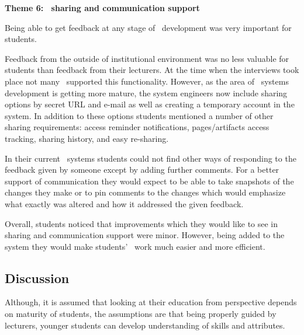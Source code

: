 \textbf{Theme 6: \ep~sharing and communication support}

Being able to get feedback at any stage of \ep~development was very important
for students.


Feedback from the outside of institutional environment was no less valuable for
students than feedback from their lecturers. At the time when the interviews
took place not many \ep~supported this functionality. However, as the area of
\ep~systems development is getting more mature, the system engineers now include
sharing options by secret URL and e-mail as well as creating a temporary account
in the system. In addition to these options students mentioned a number of other
sharing requirements: access reminder notifications, pages/artifacts access
tracking, sharing history, and easy re-sharing.

In their current \ep~systems students could not find other ways of responding to
the feedback given by someone except by adding further comments. For a better
support of communication they would expect to be able to take snapshots of the
changes they make or to pin comments to the changes which would emphasize what
exactly was altered and how it addressed the given feedback.


Overall, students noticed that improvements which they would like to see in
sharing and communication support were minor. However, being added to the system
they would make students' \ep~work much easier and more efficient.

\subsection{Discussion}

Although, it is assumed that looking at their education from \LLLs
perspective depends on maturity of students, the assumptions are that being
properly guided by lecturers, younger students can develop understanding of
\LLLs skills and attributes. 

